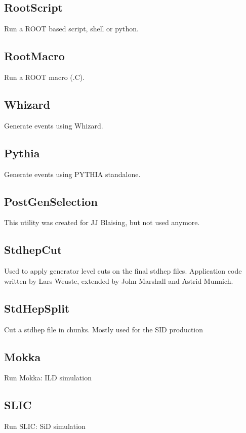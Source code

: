 \documentclass[a4paper,12pt]{article}
\begin{document}
\subsection{RootScript}\label{rootscript}
Run a ROOT based script, shell or python.

\subsection{RootMacro}\label{rootmacro}
Run a ROOT macro (.C).

\subsection{Whizard}\label{whizard}
Generate events using Whizard.

\subsection{Pythia}\label{pythia}
Generate events using PYTHIA standalone.

\subsection{PostGenSelection}\label{postgensel}
This utility was created for JJ Blaising, but not used anymore.

\subsection{StdhepCut}\label{stdhepcut}
Used to apply generator level cuts on the final stdhep files. Application code
written by Lars Weuste, extended by John Marshall and Astrid Munnich. 

\subsection{StdHepSplit}\label{stdhepsplit}
Cut a stdhep file in chunks. Mostly used for the SID production

\subsection{Mokka}\label{mokka}
Run Mokka: ILD simulation

\subsection{SLIC}\label{slic}
Run SLIC: SiD simulation
\end{document}
